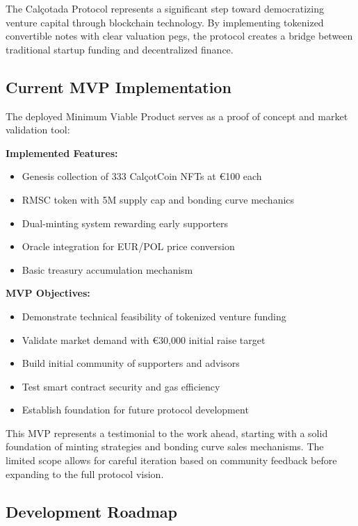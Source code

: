 \documentclass[conference]{IEEEtran}
\begin{document}
The Calçotada Protocol represents a significant step toward democratizing venture capital through blockchain technology. By implementing tokenized convertible notes with clear valuation pegs, the protocol creates a bridge between traditional startup funding and decentralized finance.

\subsection{Current MVP Implementation}

The deployed Minimum Viable Product serves as a proof of concept and market validation tool:

\textbf{Implemented Features:}
\begin{itemize}
    \item Genesis collection of 333 CalçotCoin NFTs at €100 each
    \item RMSC token with 5M supply cap and bonding curve mechanics
    \item Dual-minting system rewarding early supporters
    \item Oracle integration for EUR/POL price conversion
    \item Basic treasury accumulation mechanism
\end{itemize}

\textbf{MVP Objectives:}
\begin{itemize}
    \item Demonstrate technical feasibility of tokenized venture funding
    \item Validate market demand with €30,000 initial raise target
    \item Build initial community of supporters and advisors
    \item Test smart contract security and gas efficiency
    \item Establish foundation for future protocol development
\end{itemize}

This MVP represents a testimonial to the work ahead, starting with a solid foundation of minting strategies and bonding curve sales mechanisms. The limited scope allows for careful iteration based on community feedback before expanding to the full protocol vision.

\subsection{Development Roadmap}
\end{document}
